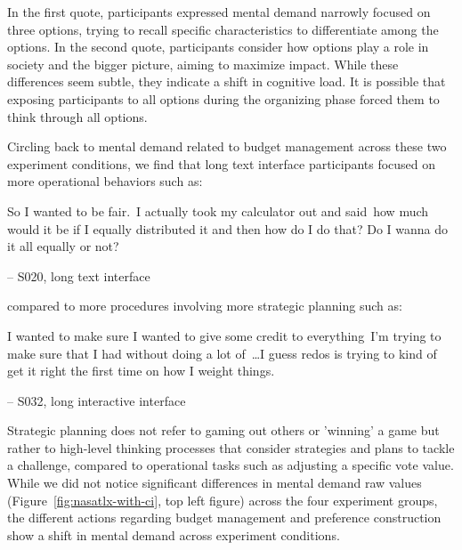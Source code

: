 In the first quote, participants expressed mental demand narrowly focused on three options, trying to recall specific characteristics to differentiate among the options. In the second quote, participants consider how options play a role in society and the bigger picture, aiming to maximize impact. While these differences seem subtle, they indicate a shift in cognitive load. It is possible that exposing participants to all options during the organizing phase forced them to think through all options.

Circling back to mental demand related to budget management across these two experiment conditions, we find that long text interface participants focused on more operational behaviors such as:

\begin{displayquote}
So I wanted to be fair.~\bracketellipsis I actually took my calculator out and said~\bracketellipsis  how much would it be if I equally distributed it and then how do I do that? Do I wanna do it all equally or not?

\noindent \hfill -- S020, long text interface
\end{displayquote}

compared to more procedures involving more strategic planning such as:

\begin{displayquote}
I wanted to make sure I wanted to give some credit to everything~\bracketellipsis I'm trying to make sure that I had without doing a lot of~\ldots I guess redos is trying to kind of get it right the first time on how I weight things.

\noindent \hfill -- S032, long interactive interface
\end{displayquote}

Strategic planning does not refer to gaming out others or 'winning' a game but rather to high-level thinking processes that consider strategies and plans to tackle a challenge, compared to operational tasks such as adjusting a specific vote value. While we did not notice significant differences in mental demand raw values (Figure~\ref{fig:nasatlx-with-ci}, top left figure) across the four experiment groups, the different actions regarding budget management and preference construction show a shift in mental demand across experiment conditions.


